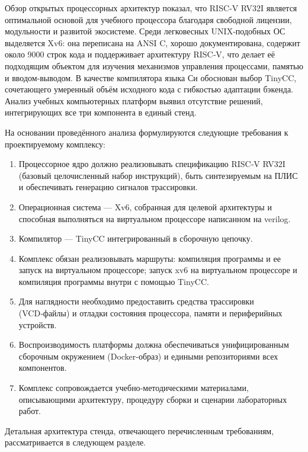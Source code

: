Обзор открытых процессорных архитектур показал, что RISC‑V RV32I является оптимальной основой для учебного процессора благодаря свободной лицензии, модульности и развитой экосистеме. Среди легковесных UNIX‑подобных ОС выделяется Xv6: она переписана на ANSI C, хорошо документирована, содержит около 9000 строк кода и поддерживает архитектуру RISC‑V, что делает её подходящим объектом для изучения механизмов управления процессами, памятью и вводом‑выводом. В качестве компилятора языка Си обоснован выбор TinyCC, сочетающего умеренный объём исходного кода с гибкостью адаптации бэкенда. Анализ учебных компьютерных платформ выявил отсутствие решений, интегрирующих все три компонента в единый стенд.

На основании проведённого анализа формулируются следующие требования к проектируемому комплексу:

\begin{enumerate}
  \item Процессорное ядро должно реализовывать спецификацию RISC‑V RV32I (базовый целочисленный набор инструкций), быть синтезируемым на ПЛИС и обеспечивать генерацию сигналов трассировки.
  \item Операционная система — Xv6, собранная для целевой архитектуры и способная выполняться на виртуальном процессоре написанном на verilog.
  \item Компилятор — TinyCC интегрированный в сборочную цепочку.
  \item Комплекс обязан реализовывать маршруты: компиляция программы и ее запуск на виртуальном процессоре; запуск xv6 на виртуальном процессоре и компиляция программы внутри с помощью TinyCC.
  \item Для наглядности необходимо предоставить средства трассировки (VCD‑файлы) и отладки состояния процессора, памяти и периферийных устройств.
  \item Воспроизводимость платформы должна обеспечиваться унифицированным сборочным окружением (Docker‑образ) и едиными репозиториями всех компонентов.
  \item Комплекс сопровождается учебно‑методическими материалами, описывающими архитектуру, процедуру сборки и сценарии лабораторных работ.
\end{enumerate}

Детальная архитектура стенда, отвечающего перечисленным требованиям, рассматривается в следующем разделе.
